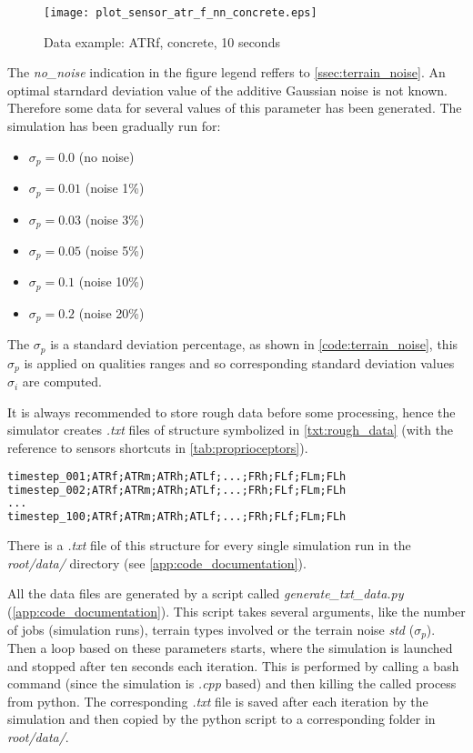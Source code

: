 \begin{figure}[H]
  \centering
  \texttt{[image: plot\_sensor\_atr\_f\_nn\_concrete.eps]}
  \caption{Data example: ATRf, concrete, 10 seconds}
  \label{fig:data_example}
\end{figure}

The \textit{no\_noise} indication in the figure legend reffers to \cref{ssec:terrain_noise}. An optimal starndard deviation value of the additive Gaussian noise is not known. Therefore some data for several values of this parameter has been generated. The simulation has been gradually run for:

\begin{itemize}
\item $ \sigma_p = 0.0 $ (no noise)
\item $ \sigma_p = 0.01 $ (noise 1\%)
\item $ \sigma_p = 0.03 $ (noise 3\%)
\item $ \sigma_p = 0.05 $ (noise 5\%)
\item $ \sigma_p = 0.1 $ (noise 10\%)
\item $ \sigma_p = 0.2 $ (noise 20\%)
\end{itemize}

The $ \sigma_p $ is a standard deviation percentage, as shown in \cref{code:terrain_noise}, this $ \sigma_p $ is applied on qualities ranges and so corresponding standard deviation values $ \sigma_i $ are computed.

It is always recommended to store rough data before some processing, hence the simulator creates \textit{.txt} files of structure symbolized in \cref{txt:rough_data} (with the reference to sensors shortcuts in \cref{tab:proprioceptors}). 

\begin{lstlisting}[language=XML, caption={Rough sensory data files structure}, label=txt:rough_data]
timestep_001;ATRf;ATRm;ATRh;ATLf;...;FRh;FLf;FLm;FLh
timestep_002;ATRf;ATRm;ATRh;ATLf;...;FRh;FLf;FLm;FLh
...
timestep_100;ATRf;ATRm;ATRh;ATLf;...;FRh;FLf;FLm;FLh
\end{lstlisting}

There is a \textit{.txt} file of this structure for every single simulation run in the \textit{root/data/} directory (see \cref{app:code_documentation}).

All the data files are generated by a script called \textit{generate\_txt\_data.py} (\ref{app:code_documentation}). This script takes several arguments, like the number of jobs (simulation runs), terrain types involved or the terrain noise \textit{std} ($ \sigma_p $). Then a loop based on these parameters starts, where the simulation is launched and stopped after ten seconds each iteration. This is performed by calling a bash command (since the simulation is \textit{.cpp} based) and then killing the called process from python. The corresponding \textit{.txt} file is saved after each iteration by the simulation and then copied by the python script to a corresponding folder in \textit{root/data/}.

